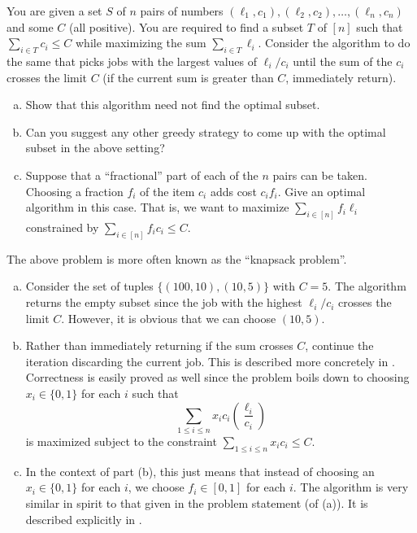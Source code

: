 \begin{exercise}
	You are given a set $S$ of $n$ pairs of numbers $(\ell_1,c_1),(\ell_2,c_2),\ldots,(\ell_n,c_n)$ and some $C$ (all positive). You are required to find a subset $T$ of $[n]$ such that $\sum_{i\in T} c_i \leq C$ while maximizing the sum $\sum_{i\in T}\ell_i$. Consider the algorithm to do the same that picks jobs with the largest values of $\ell_i/c_i$ until the sum of the $c_i$ crosses the limit $C$ (if the current sum is greater than $C$, immediately return).
	\begin{enumerate}[(a)]
		\item Show that this algorithm need not find the optimal subset.
		\item Can you suggest any other greedy strategy to come up with the optimal subset in the above setting?
		\item Suppose that a ``fractional'' part of each of the $n$ pairs can be taken. Choosing a fraction $f_i$ of the item $c_i$ adds cost $c_i f_i$. Give an optimal algorithm in this case. That is, we want to maximize $\sum_{i\in [n]} f_i \ell_i$ constrained by $\sum_{i\in[n]} f_i c_i \leq C$.
	\end{enumerate}
	The above problem is more often known as the ``knapsack problem''.
\end{exercise}
\begin{solution*}
	\begin{enumerate}[(a)]
		\item Consider the set of tuples $\{(100,10),(10,5)\}$ with $C=5$. The algorithm returns the empty subset since the job with the highest $\ell_i/c_i$ crosses the limit $C$. However, it is obvious that we can choose $(10,5)$.

		\item Rather than immediately returning if the sum crosses $C$, continue the iteration discarding the current job. This is described more concretely in . Correctness is easily proved as well since the problem boils down to choosing $x_i\in\{0,1\}$ for each $i$ such that
		\[ \sum_{1\leq i\leq n} x_i c_i \left(\frac{\ell_i}{c_i}\right) \]
		is maximized subject to the constraint $\sum_{1\leq i\leq n} x_i c_i \leq C$.

		\item In the context of part (b), this just means that instead of choosing an $x_i\in\{0,1\}$ for each $i$, we choose $f_i\in[0,1]$ for each $i$. The algorithm is very similar in spirit to that given in the problem statement (of (a)). It is described explicitly in .

	\end{enumerate}
\end{solution*}

